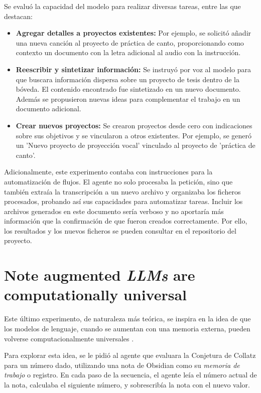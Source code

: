 Se evaluó la capacidad del modelo para realizar diversas tareas, entre las que destacan:
\begin{itemize}
    \item \textbf{Agregar detalles a proyectos existentes:} Por ejemplo, se solicitó añadir una nueva canción al proyecto de práctica de canto, proporcionando como contexto un documento con la letra adicional al audio con la instrucción.
    \item \textbf{Reescribir y sintetizar información:} Se instruyó por voz al modelo para que buscara información dispersa sobre un proyecto de tesis dentro de la bóveda. El contenido encontrado fue sintetizado en un nuevo documento. Además se propusieron nuevas ideas para complementar el trabajo en un documento adicional.
    \item \textbf{Crear nuevos proyectos:} Se crearon proyectos desde cero con indicaciones sobre sus objetivos y se vincularon a otros existentes. Por ejemplo, se generó un 'Nuevo proyecto de proyección vocal' vinculado al proyecto de 'práctica de canto'.
\end{itemize}

Adicionalmente, este experimento contaba con instrucciones para la automatización de flujos. El agente no solo procesaba la petición, sino que también extraía la transcripción a un nuevo archivo y organizaba los ficheros procesados, probando así sus capacidades para automatizar tareas. Incluir los archivos generados en este documento sería verboso y no aportaría más información que la confirmación de que fueron creados correctamente. Por ello, los resultados y los nuevos ficheros se pueden consultar en el repositorio del proyecto.

\section{Note augmented \textit{LLMs} are computationally universal}
Este último experimento, de naturaleza más teórica, se inspira en la idea de que los modelos de lenguaje, cuando se aumentan con una memoria externa, pueden volverse computacionalmente universales \parencite{schuurmansMemoryAugmentedLarge2023}.

Para explorar esta idea, se le pidió al agente que evaluara la Conjetura de Collatz para un número dado, utilizando una nota de Obsidian como su \textit{memoria de trabajo} o registro. En cada paso de la secuencia, el agente leía el número actual de la nota, calculaba el siguiente número, y sobrescribía la nota con el nuevo valor.

